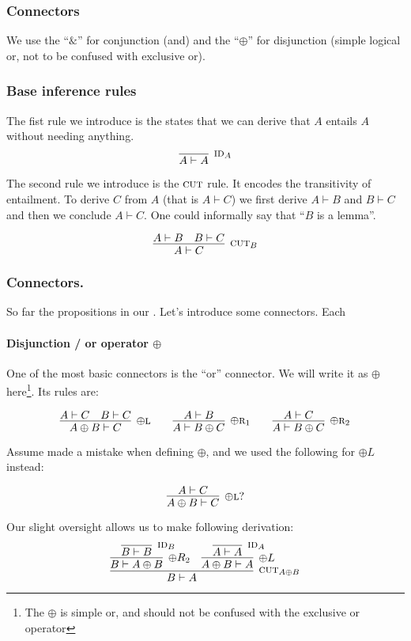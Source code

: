 \documentclass{article}
\begin{document}
\subsubsection{Connectors}

We use the ``\(\&\)'' for conjunction (and) and the ``\(\oplus\)'' for
disjunction (simple logical or, not to be confused with exclusive or).

\subsubsection{Base inference rules}
The fist rule we introduce is the states that we can derive that \(A\) entails \(A\) without needing anything. 
\[
\infer[\textsc{id}_A]{A \vdash A}{}
\]

The second rule we introduce is the \(\textsc{cut}\) rule. It encodes the transitivity of entailment. To derive \(C\) from \(A\) (that is \(A \vdash C\)) we first derive \(A \vdash B\) and \(B \vdash C\) and then we conclude \(A \vdash C\). One could informally say that ``\(B\) is a lemma''.

\[
\infer[\textsc{cut}_B]
{A \vdash C}{A \vdash B & B \vdash C}
\]


\subsubsection{Connectors.} 
So far the propositions in our . Let's introduce some connectors. Each 

\paragraph{Disjunction / or operator \(\oplus\)}
One of the most basic connectors is the ``or'' connector. We will write it as \(\oplus\) here\footnote{The \(\oplus\) is simple or, and should not be confused with the exclusive or operator}. Its rules are:

\[
\infer[\oplus\textsc{l}]
{A \oplus B \vdash C}{A \vdash C & B \vdash C}
\qquad
\infer[\oplus\textsc{r}_1]
{A \vdash B \oplus C}{A \vdash B}
\qquad
\infer[\oplus\textsc{r}_2]
{A \vdash B \oplus C}{A \vdash C}
\]



Assume made a mistake when defining \( \oplus \), and we used the following for \(\oplus L\) instead:

\[
\infer[\oplus \textsc{l}?]{A \oplus B \vdash C}{A \vdash C}
\]

Our slight oversight allows us to make following derivation:
\[
\infer[\textsc{cut}_{A \oplus B}]
{B \vdash A}
{
	\infer[\oplus R_2]
	{B \vdash A \oplus B}
	{
		\infer[\textsc{id}_B]
		{B \vdash B}
		{}
	}
	&
	\infer[\oplus L]
	{A \oplus B \vdash A}
	{
		\infer[\textsc{id}_A]
		{A \vdash A}
		{}
	}
}
\]
\end{document}
